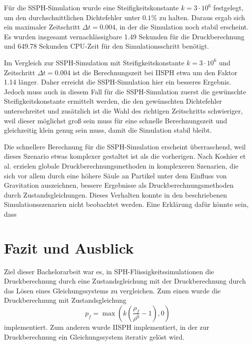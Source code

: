 \documentclass[11pt,
a4paper,
parskip=half, %
BCOR=10mm, %
english,
ngerman]{scrreprt}
\begin{document}
Für die SSPH-Simulation wurde eine Steifigkeitskonstante $k = 3 \cdot 10^6$ festgelegt, um den durchschnittlichen Dichtefehler unter $0.1 \%$ zu halten.
Daraus ergab sich ein maximaler Zeitschritt $\Delta t = 0.004$, in der die Simulation noch stabil erscheint.
Es wurden insgesamt vernachlässigbare 1.49 Sekunden für die Druckberechnung und 649.78 Sekunden CPU-Zeit für den Simulationsschritt benötigt.

Im Vergleich zur SSPH-Simulation mit Steifigkeitskonstante $k = 3 \cdot 10^6$ und Zeitschritt $\Delta t = 0.004$ ist die Berechnungszeit bei IISPH etwa um den Faktor 1.14 länger.
Daher erreicht die SSPH-Simulation hier ein besseres Ergebnis.
Jedoch muss auch in diesem Fall für die SSPH-Simulation zuerst die gewünschte Steifigkeitskonstante ermittelt werden,
die den gewünschten Dichtefehler unterschreitet und zusätzlich ist die Wahl des richtigen Zeitschritts schwieriger,
weil dieser möglichst groß sein muss für eine schnelle Berechnungszeit und gleichzeitig klein genug sein muss, damit die Simulation stabil bleibt.

Die schnellere Berechnung für die SSPH-Simulation erscheint überraschend, weil dieses Szenario etwas komplexer gestaltet ist als die vorherigen.
Nach Koshier et al. \cite{koschier_smoothed_2020} erzielen globale Druckberechnungsmethoden in komplexeren Szenarien,
die sich vor allem durch eine höhere Säule an Partikel unter dem Einfluss von Gravitation auszeichnen,
bessere Ergebnisse als Druckberechnungsmethoden durch Zustandsgleichungen.
Dieses Verhalten konnte in den beschriebenen Simulationsszenarien nicht beobachtet werden.
Eine Erklärung dafür könnte sein, dass 

\chapter{Fazit und Ausblick}
Ziel dieser Bachelorarbeit war es,
in SPH-Flüssigkeitssimulationen die Druckberechnung durch eine Zustandsgleichung mit der Druckberechnung durch das Lösen eines Gleichungssystems zu vergleichen.
Zum einen wurde die Druckberechnung mit Zustandsgleichung
\begin{equation}
    p_f = \max\left(k \left(\frac{\rho_f}{\rho^0} - 1\right), 0\right)
\end{equation}
implementiert.
Zum anderen wurde IISPH implementiert, in der zur Druckberechnung ein Gleichungssystem iterativ gelöst wird.
\end{document}
